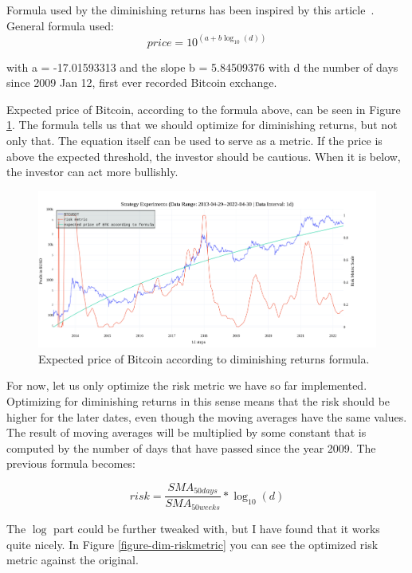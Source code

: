 Formula used by the diminishing returns has been inspired by this article~\cite{bitcoin-diminishing-returns-formula}. General formula used:
$$price = 10^{(a + b \log_{10}(d))}$$

with a = -17.01593313 and the slope b = 5.84509376 with d the number of days since 2009 Jan 12, first ever recorded Bitcoin exchange.

Expected price of Bitcoin, according to the formula above, can be seen in Figure \ref{figure-dim-formula}. The formula tells us that we should optimize for diminishing returns, but not only that. The equation itself can be used to serve as a metric. If the price is above the expected threshold, the investor should be cautious. When it is below, the investor can act more bullishly.

\begin{figure}[!hbt]
    \centering
    \includegraphics[width=\columnwidth]{figures/expected-price-formula.png}
    \caption{Expected price of Bitcoin according to diminishing returns formula.}
    \label{figure-dim-formula}
\end{figure}


For now, let us only optimize the risk metric we have so far implemented. Optimizing for diminishing returns in this sense means that the risk should be higher for the later dates, even though the moving averages have the same values. The result of moving averages will be multiplied by some constant that is computed by the number of days that have passed since the year 2009. The previous formula becomes:

$$risk = \frac{\mathit{SMA}_{50 days}}{\mathit{SMA}_{50 weeks}} * \log_{10}(d)$$

The $\log$ part could be further tweaked with, but I have found that it works quite nicely. In Figure \ref{figure-dim-riskmetric} you can see the optimized risk metric against the original.

